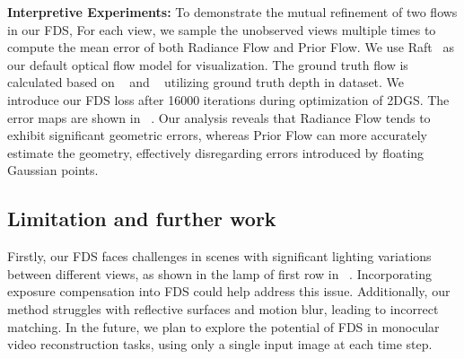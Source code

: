 





\textbf{Interpretive Experiments: }
To demonstrate the mutual refinement of two flows in our FDS, 
For each view, we sample the unobserved 
views multiple times to compute the mean error 
of both Radiance Flow and Prior Flow. 
We use Raft~\citep{teed2020raft} as our default optical flow model
for visualization.
The ground truth flow is calculated based on 
~ and ~ 
utilizing ground truth depth in dataset.
We introduce our FDS loss after 16000 iterations during 
optimization of 2DGS.
The error maps are shown in ~.
Our analysis reveals that Radiance Flow tends to 
exhibit significant geometric errors, 
whereas Prior Flow can more accurately estimate the geometry,
effectively disregarding errors introduced by floating Gaussian points. 

%





\subsection{Limitation and further work}

Firstly, our FDS faces challenges in scenes with 
significant lighting variations between different 
views, as shown in the lamp of first row in ~. 
%
Incorporating exposure compensation into FDS could help address this issue. 
%
 Additionally, our method struggles with 
 reflective surfaces and motion blur,
 leading to incorrect matching. 
 In the future, we plan to explore the potential 
 of FDS in monocular video reconstruction tasks, 
 using only a single input image at each time step.
 


